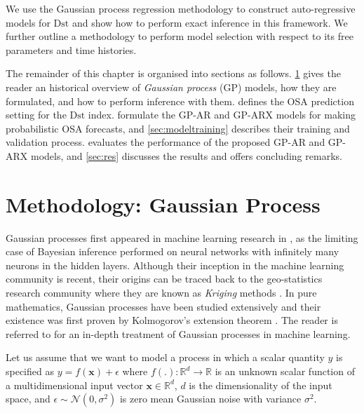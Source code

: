 We use the Gaussian process regression methodology to construct auto-regressive models for 
$\mathrm{Dst}$ and show how to perform exact inference in this framework. We further outline a 
methodology to perform model selection with respect to its free parameters and time histories.

The remainder of this chapter is organised into sections as follows. 
\cref{sec:osaGPmethod} gives the reader an historical overview of 
\emph{Gaussian process} (GP) models, how they are formulated, and how to 
perform inference with them.  defines the OSA prediction setting for the 
$\mathrm{Dst}$ index.  formulate the GP-AR and GP-ARX models for making 
probabilistic OSA forecasts, and \cref{sec:modeltraining} describes their training and validation 
process.  evaluates the performance of the proposed GP-AR and GP-ARX models, 
and \cref{sec:res} discusses the results and offers concluding remarks.

\section{Methodology: Gaussian Process} \label{sec:osaGPmethod}

Gaussian processes first appeared in machine learning research in \citet{Neal:1996:BLN:525544}, 
as the limiting case of Bayesian inference performed on neural networks with infinitely many 
neurons in the hidden layers. Although their inception in the machine learning community is recent, 
their origins can be traced back to the geo-statistics research community where they are known as 
\emph{Kriging} methods \citep{krige1951statistical}. In pure mathematics, Gaussian processes have 
been studied extensively and their existence was first proven by Kolmogorov's extension theorem 
\citep{tao2011introduction}. The reader is referred to \citet{Rasmussen:2005:GPM:1162254} for an 
in-depth treatment of Gaussian processes in machine learning.

Let us assume that we want to model a process in which a scalar quantity $y$ is specified as 
$y = f(\mathbf{x}) + \epsilon$ where   $f(.): \mathbb{R}^d \rightarrow \mathbb{R}$ is an unknown 
scalar function of a multidimensional input vector $\mathbf{x} \in \mathbb{R}^d$, $d$ is the 
dimensionality of the input space, and $\epsilon \sim \mathcal{N}(0, \sigma^2)$ is zero mean 
Gaussian noise with variance $\sigma^2$.

